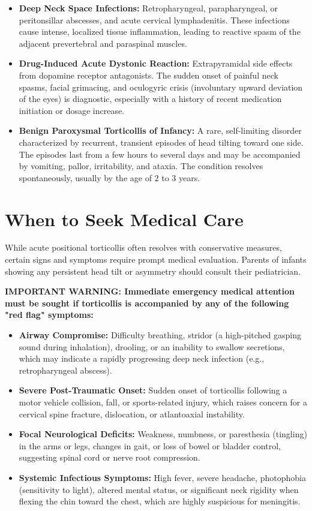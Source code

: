 \begin{itemize}
    \item \textbf{Deep Neck Space Infections:} Retropharyngeal, parapharyngeal, or peritonsillar abscesses, and acute cervical lymphadenitis. These infections cause intense, localized tissue inflammation, leading to reactive spasm of the adjacent prevertebral and paraspinal muscles.
    \item \textbf{Drug-Induced Acute Dystonic Reaction:} Extrapyramidal side effects from dopamine receptor antagonists. The sudden onset of painful neck spasms, facial grimacing, and oculogyric crisis (involuntary upward deviation of the eyes) is diagnostic, especially with a history of recent medication initiation or dosage increase.
    \item \textbf{Benign Paroxysmal Torticollis of Infancy:} A rare, self-limiting disorder characterized by recurrent, transient episodes of head tilting toward one side. The episodes last from a few hours to several days and may be accompanied by vomiting, pallor, irritability, and ataxia. The condition resolves spontaneously, usually by the age of 2 to 3 years.
\end{itemize}

\section*{When to Seek Medical Care}
While acute positional torticollis often resolves with conservative measures, certain signs and symptoms require prompt medical evaluation. Parents of infants showing any persistent head tilt or asymmetry should consult their pediatrician.

\noindent\textbf{IMPORTANT WARNING: Immediate emergency medical attention must be sought if torticollis is accompanied by any of the following "red flag" symptoms:}

\begin{itemize}
    \item \textbf{Airway Compromise:} Difficulty breathing, stridor (a high-pitched gasping sound during inhalation), drooling, or an inability to swallow secretions, which may indicate a rapidly progressing deep neck infection (e.g., retropharyngeal abscess).
    \item \textbf{Severe Post-Traumatic Onset:} Sudden onset of torticollis following a motor vehicle collision, fall, or sports-related injury, which raises concern for a cervical spine fracture, dislocation, or atlantoaxial instability.
    \item \textbf{Focal Neurological Deficits:} Weakness, numbness, or paresthesia (tingling) in the arms or legs, changes in gait, or loss of bowel or bladder control, suggesting spinal cord or nerve root compression.
    \item \textbf{Systemic Infectious Symptoms:} High fever, severe headache, photophobia (sensitivity to light), altered mental status, or significant neck rigidity when flexing the chin toward the chest, which are highly suspicious for meningitis.
\end{itemize}

